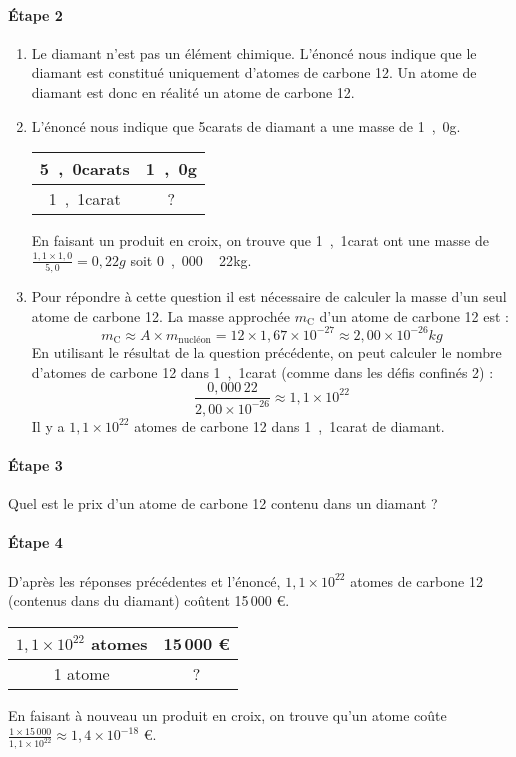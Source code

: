 \documentclass[12pt,a4paper]{article}
\begin{document}
\paragraph{Étape 2}
\begin{enumerate}
\item Le diamant n'est pas un élément chimique.
L'énoncé nous indique que le diamant est constitué uniquement d'atomes de carbone 12.
Un \og atome de diamant \fg{} est donc en réalité un atome de carbone 12.
\item L'énoncé nous indique que \unit{5}{carats} de diamant a une masse de \unit{1{,}0}{g}.
\begin{center}
\begin{tabular}{c|c}
\unit{5{,}0}{carats} & \unit{1{,}0}{g} \\
\hline
\unit{1{,}1}{carat} & ?
\end{tabular}
\end{center}
En faisant un produit en croix, on trouve que \unit{1{,}1}{carat} ont une masse de $\frac{1{,}1\times 1{,}0}{5{,}0} = \unit{0{,}22}{g}$ soit \unit{0{,}000\,22}{kg}.
\item Pour répondre à cette question il est nécessaire de calculer la masse d'un seul atome de carbone 12.
La masse approchée $m_\mathrm{C}$ d'un atome de carbone 12 est :
\[
m_\mathrm{C} \approx A \times m_\mathrm{nucléon} = 12 \times 1{,}67\times 10^{-27} \approx \unit{2{,}00\times10^{-26}}{kg}
\]
En utilisant le résultat de la question précédente, on peut calculer le nombre d'atomes de carbone 12 dans \unit{1{,}1}{carat} (comme dans les défis confinés 2) :
\[
\frac{0{,}000\,22}{2{,}00\times10^{-26}} \approx 1{,}1 \times 10^{22}
\]
Il y a $1{,}1 \times 10^{22}$ atomes de carbone 12 dans \unit{1{,}1}{carat} de diamant.
\end{enumerate}

\paragraph{Étape 3}
Quel est le prix d'un atome de carbone 12 contenu dans un diamant ?

\paragraph{Étape 4}
D'après les réponses précédentes et l'énoncé, $1{,}1 \times 10^{22}$ atomes de carbone 12 (contenus dans du diamant) coûtent 15\,000 €. 
\begin{center}
\begin{tabular}{c|c}
$1{,}1 \times 10^{22}$ atomes & 15\,000 €\\
\hline
1 atome & ?
\end{tabular}
\end{center}
En faisant à nouveau un produit en croix, on trouve qu'un atome coûte $\frac{1\times 15\,000}{1{,}1 \times 10^{22}} \approx 1{,}4 \times 10^{-18}$ €.
\end{document}
